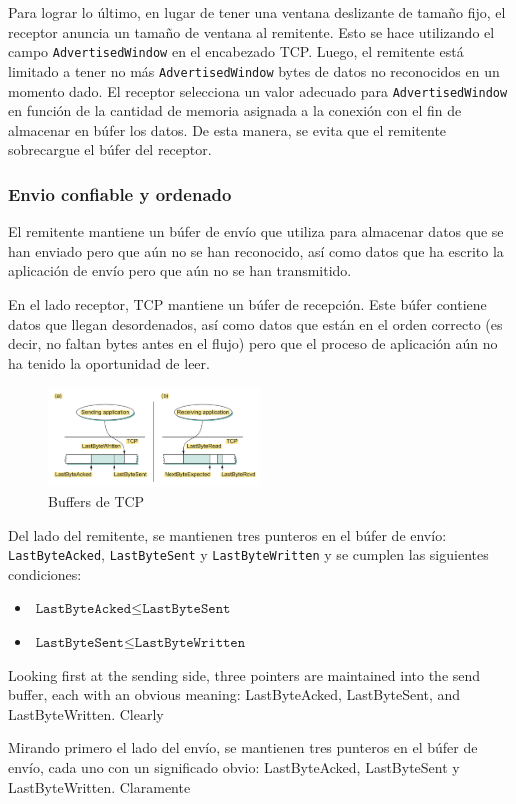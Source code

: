 Para lograr lo último, en lugar de tener una ventana deslizante de tamaño fijo, el receptor anuncia un tamaño de ventana al remitente. Esto se hace utilizando el campo \texttt{AdvertisedWindow} en el encabezado TCP. Luego, el remitente está limitado a tener no más \texttt{AdvertisedWindow} bytes de datos no reconocidos en un momento dado. El receptor selecciona un valor adecuado para \texttt{AdvertisedWindow} en función de la cantidad de memoria asignada a la conexión con el fin de almacenar en búfer los datos. De esta manera, se evita que el remitente sobrecargue el búfer del receptor.

\subsubsection*{Envio confiable y ordenado}
El remitente mantiene un búfer de envío que utiliza para almacenar datos que se han enviado pero que aún no se han reconocido, así como datos que ha escrito la aplicación de envío pero que aún no se han transmitido.

En el lado receptor, TCP mantiene un búfer de recepción. Este búfer contiene datos que llegan desordenados, así como datos que están en el orden correcto (es decir, no faltan bytes antes en el flujo) pero que el proceso de aplicación aún no ha tenido la oportunidad de leer.

\begin{figure}[H]
	\centering
	\includegraphics[width=0.5\textwidth
]{images/tcp-buffers.png}
	\caption[Buffers de TCP]{Buffers de TCP}
	\label{fig:tcp-buffers}
\end{figure}

Del lado del remitente, se mantienen tres punteros en el búfer de envío: \texttt{LastByteAcked}, \texttt{LastByteSent} y \texttt{LastByteWritten} y se cumplen las siguientes condiciones:
\begin{itemize}
  \item \(\texttt{LastByteAcked} \leq \texttt{LastByteSent}\)
  \item \(\texttt{LastByteSent} \leq \texttt{LastByteWritten}\)
\end{itemize}

\newpage

Looking first at the sending side, three pointers are maintained into the
send buffer, each with an obvious meaning: LastByteAcked, LastByteSent,
and LastByteWritten. Clearly

Mirando primero el lado del envío, se mantienen tres punteros en el búfer de envío, cada uno con un significado obvio: LastByteAcked, LastByteSent y LastByteWritten. Claramente

